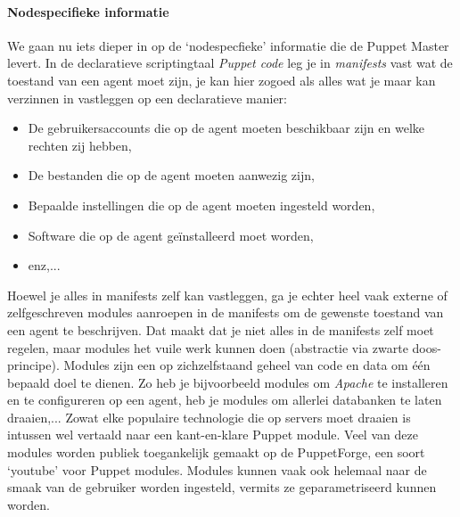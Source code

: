 \documentclass[a4paper,11pt]{article}
\theoremstyle{definition}
\begin{document}
\paragraph{Nodespecifieke informatie}
We gaan nu iets dieper in op de `nodespecfieke' informatie die de Puppet Master 
levert. In de declaratieve scriptingtaal \emph{Puppet code} leg je in \emph{manifests} 
vast wat de toestand van een agent moet zijn, je kan hier zogoed als alles wat 
je maar kan verzinnen in vastleggen op een declaratieve manier:

\begin{itemize}
  \item De gebruikersaccounts die op de agent moeten beschikbaar zijn en welke rechten zij hebben,
  \item De bestanden die op de agent moeten aanwezig zijn,
  \item Bepaalde instellingen die op de agent moeten ingesteld worden,
  \item Software die op de agent geïnstalleerd moet worden,
  \item enz,...
\end{itemize}

\noindent Hoewel je alles in manifests zelf kan vastleggen, ga je echter heel vaak externe 
of zelfgeschreven modules aanroepen in de manifests om de gewenste toestand van een agent te 
beschrijven. Dat maakt dat je niet alles in de manifests zelf moet regelen, maar
modules het vuile werk kunnen doen (abstractie via zwarte doos-principe). Modules zijn een op zichzelfstaand geheel van code en data om één 
bepaald doel te dienen. Zo heb je bijvoorbeeld modules om \emph{Apache} te installeren 
en te configureren op een agent, heb je modules om allerlei databanken te laten 
draaien,... Zowat elke populaire technologie die op servers moet draaien is 
intussen wel vertaald naar een kant-en-klare Puppet module. Veel van deze modules worden
publiek toegankelijk gemaakt op de PuppetForge, een soort `youtube' voor Puppet modules. Modules kunnen vaak 
ook helemaal naar de smaak van de gebruiker worden ingesteld, vermits ze 
geparametriseerd kunnen worden. \\
\end{document}
